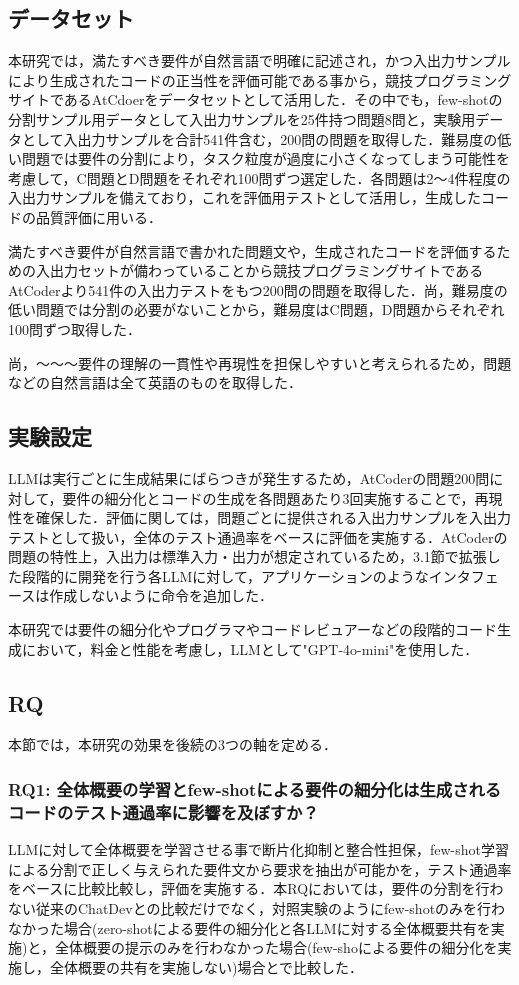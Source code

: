 \documentclass[submit,techrep,noauthor]{ipsj}
\begin{document}
\subsection{データセット}
本研究では，満たすべき要件が自然言語で明確に記述され，かつ入出力サンプルにより生成されたコードの正当性を評価可能である事から，競技プログラミングサイトであるAtCdoerをデータセットとして活用した．その中でも，few-shotの分割サンプル用データとして入出力サンプルを25件持つ問題8問と，実験用データとして入出力サンプルを合計541件含む，200問の問題を取得した．難易度の低い問題では要件の分割により，タスク粒度が過度に小さくなってしまう可能性を考慮して，C問題とD問題をそれぞれ100問ずつ選定した．各問題は2〜4件程度の入出力サンプルを備えており，これを評価用テストとして活用し，生成したコードの品質評価に用いる．

満たすべき要件が自然言語で書かれた問題文や，生成されたコードを評価するための入出力セットが備わっていることから競技プログラミングサイトであるAtCoder\cite{AtCoder}より541件の入出力テストをもつ200問の問題を取得した．尚，難易度の低い問題では分割の必要がないことから，難易度はC問題，D問題からそれぞれ100問ずつ取得した．

尚，〜〜〜要件の理解の一貫性や再現性を担保しやすいと考えられるため，問題などの自然言語は全て英語のものを取得した．

\subsection{実験設定}
LLMは実行ごとに生成結果にばらつきが発生するため，AtCoderの問題200問に対して，要件の細分化とコードの生成を各問題あたり3回実施することで，再現性を確保した．評価に関しては，問題ごとに提供される入出力サンプルを入出力テストとして扱い，全体のテスト通過率をベースに評価を実施する．AtCoderの問題の特性上，入出力は標準入力・出力が想定されているため，3.1節で拡張した段階的に開発を行う各LLMに対して，アプリケーションのようなインタフェースは作成しないように命令を追加した．

本研究では要件の細分化やプログラマやコードレビュアーなどの段階的コード生成において，料金と性能を考慮し，LLMとして"GPT-4o-mini"\cite{openai_gpt_4o_mini}を使用した．


\subsection{RQ}
本節では，本研究の効果を後続の3つの軸を定める．

\subsubsection{RQ1: 全体概要の学習とfew-shotによる要件の細分化は生成されるコードのテスト通過率に影響を及ぼすか？}
LLMに対して全体概要を学習させる事で断片化抑制と整合性担保，few-shot学習による分割で正しく与えられた要件文から要求を抽出が可能かを，テスト通過率をベースに比較比較し，評価を実施する．本RQにおいては，要件の分割を行わない従来のChatDevとの比較だけでなく，対照実験のようにfew-shotのみを行わなかった場合(zero-shotによる要件の細分化と各LLMに対する全体概要共有を実施)と，全体概要の提示のみを行わなかった場合(few-shoによる要件の細分化を実施し，全体概要の共有を実施しない)場合とで比較した．
\end{document}
